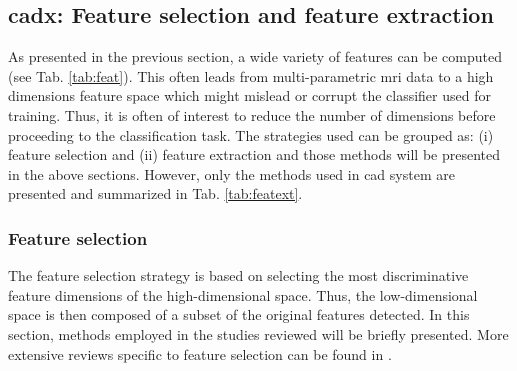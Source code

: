 \subsection{\ac{cadx}: Feature selection and feature extraction} \label{subsec:featureselectionextraction}

As presented in the previous section, a wide variety of features can be computed (see Tab. \ref{tab:feat}). This often leads from multi-parametric \ac{mri} data to a high dimensions feature space which might mislead or corrupt the classifier used for training. Thus, it is often of interest to reduce the number of dimensions before proceeding to the classification task. The strategies used can be grouped as: (i) feature selection and (ii) feature extraction and those methods will be presented in the above sections. However, only the methods used in \ac{cad} system are presented and summarized in Tab. \ref{tab:featext}.

\subsubsection{Feature selection}\label{subsubsec:featsel}

The feature selection strategy is based on selecting the most discriminative feature dimensions of the high-dimensional space. Thus, the low-dimensional space is then composed of a subset of the original features detected. In this section, methods employed in the studies reviewed will be briefly presented. More extensive reviews specific to feature selection can be found in \cite{Saeys2007}.

